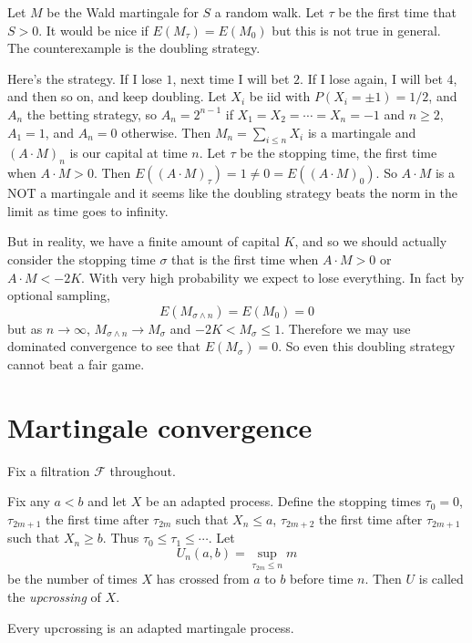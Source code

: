 \documentclass[12pt]{book}
\newcommand{\dfn}[1]{\emph{#1}\index{#1}}
\theoremstyle{definition}
\newenvironment{definition}
  {\pushQED{\qed}\renewcommand{\qedsymbol}{$\diamondsuit$}\definitionx}
  {\popQED\endexamplex}
\newenvironment{example}
  {\pushQED{\qed}\renewcommand{\qedsymbol}{$\diamondsuit$}\examplex}
  {\popQED\endexamplex}
\begin{document}
\begin{example}
Let $M$ be the Wald martingale for $S$ a random walk.
Let $\tau$ be the first time that $S > 0$.
It would be nice if $E(M_\tau) = E(M_0)$ but this is not true in general.
The counterexample is the doubling strategy.

Here's the strategy. If I lose $1$, next time I will bet $2$.
If I lose again, I will bet $4$, and then so on, and keep doubling.
Let $X_i$ be iid with $P(X_i = \pm 1) = 1/2$, and $A_n$ the betting strategy, so $A_n = 2^{n-1}$ if $X_1 = X_2 = \cdots = X_n = -1$ and $n \geq 2$, $A_1 = 1$, and $A_n = 0$ otherwise.
Then $M_n = \sum_{i\leq n} X_i$ is a martingale and $(A \cdot M)_n$ is our capital at time $n$.
Let $\tau$ be the stopping time, the first time when $A \cdot M > 0$.
Then $E((A \cdot M)_\tau) = 1 \neq 0 = E((A \cdot M)_0)$.
So $A \cdot M$ is a NOT a martingale and it seems like the doubling strategy beats the norm in the limit as time goes to infinity.

But in reality, we have a finite amount of capital $K$, and so we should actually consider the stopping time $\sigma$ that is the first time when $A \cdot M > 0$ or $A \cdot M < -2K$.
With very high probability we expect to lose everything. In fact by optional sampling,
$$E(M_{\sigma \wedge n}) = E(M_0) = 0$$
but as $n \to \infty$, $M_{\sigma \wedge n} \to M_\sigma$ and $-2K < M_\sigma \leq 1$.
Therefore we may use dominated convergence to see that $E(M_\sigma) = 0$.
So even this doubling strategy cannot beat a fair game.
\end{example}

\section{Martingale convergence}
Fix a filtration $\mathcal F$ throughout.

\begin{definition}
Fix any $a < b$ and let $X$ be an adapted process.
Define the stopping times $\tau_0 = 0$, $\tau_{2m+1}$ the first time after $\tau_{2m}$ such that $X_n \leq a$, $\tau_{2m+2}$ the first time after $\tau_{2m+1}$ such that $X_n \geq b$.
Thus $\tau_0 \leq \tau_1 \leq \cdots$.
Let
$$U_n(a, b) = \sup_{\tau_{2m} \leq n} m$$
be the number of times $X$ has crossed from $a$ to $b$ before time $n$.
Then $U$ is called the \dfn{upcrossing} of $X$.
\end{definition}

Every upcrossing is an adapted martingale process.
\end{document}
